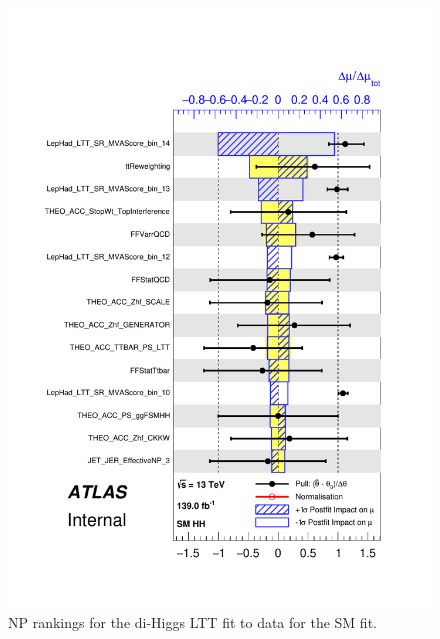 \begin{figure}
\centering
\includegraphics[width=.8\textwidth]{figures/results/HH/LepHad/pulls_SigXsecOverSM_125_LTT.pdf}
\caption{NP rankings for the di-Higgs \lephad LTT fit to data for the SM fit.}
\label{fig:LepHadPostfitNPRankingsSMLTT}
\end{figure}

